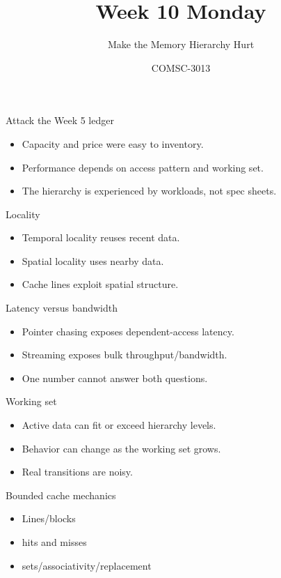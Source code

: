 \documentclass{beamer}
\title{Week 10 Monday}\subtitle{Make the Memory Hierarchy Hurt}\author{COMSC-3013}\date{}
\begin{document}
\begin{frame}\titlepage\end{frame}
\begin{frame}{Attack the Week 5 ledger}\begin{itemize}\item Capacity and price were easy to inventory.\item Performance depends on access pattern and working set.\item The hierarchy is experienced by workloads, not spec sheets.\end{itemize}\end{frame}
\begin{frame}{Locality}\begin{itemize}\item Temporal locality reuses recent data.\item Spatial locality uses nearby data.\item Cache lines exploit spatial structure.\end{itemize}\end{frame}
\begin{frame}{Latency versus bandwidth}\begin{itemize}\item Pointer chasing exposes dependent-access latency.\item Streaming exposes bulk throughput/bandwidth.\item One number cannot answer both questions.\end{itemize}\end{frame}
\begin{frame}{Working set}\begin{itemize}\item Active data can fit or exceed hierarchy levels.\item Behavior can change as the working set grows.\item Real transitions are noisy.\end{itemize}\end{frame}
\begin{frame}{Bounded cache mechanics}\begin{itemize}\item Lines/blocks\item hits and misses\item sets/associativity/replacement\end{itemize}\end{frame}
\end{document}
